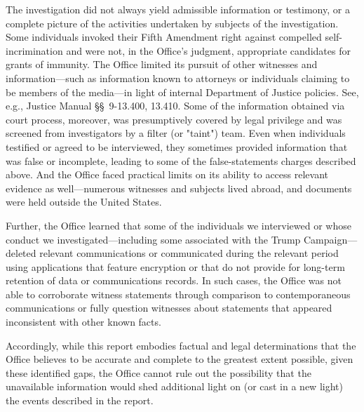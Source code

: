 The investigation did not always yield admissible information or testimony, or a complete picture of the activities undertaken by subjects of the investigation.
Some individuals invoked their Fifth Amendment right against compelled self-incrimination and were not, in the Office's judgment, appropriate candidates for grants of immunity.
The Office limited its pursuit of other witnesses and information---such as information known to attorneys or individuals claiming to be members of the media---in light of internal Department of Justice policies.
See, e.g., Justice Manual \S\S~9-13.400, 13.410. Some of the information obtained via court process, moreover, was presumptively covered by legal privilege and was screened from investigators by a filter (or "taint") team.
Even when individuals testified or agreed to be interviewed, they sometimes provided information that was false or incomplete, leading to some of the false-statements charges described above.
And the Office faced practical limits on its ability to access relevant evidence as well---numerous witnesses and subjects lived abroad, and documents were held outside the United States.

Further, the Office learned that some of the individuals we interviewed or whose conduct we investigated---including some associated with the Trump Campaign---deleted relevant communications or communicated during the relevant period using applications that feature encryption or that do not provide for long-term retention of data or communications records.
In such cases, the Office was not able to corroborate witness statements through comparison to contemporaneous communications or fully question witnesses about statements that appeared inconsistent with other known facts.

Accordingly, while this report embodies factual and legal determinations that the Office believes to be accurate and complete to the greatest extent possible, given these identified gaps, the Office cannot rule out the possibility that the unavailable information would shed additional light on (or cast in a new light) the events described in the report.

